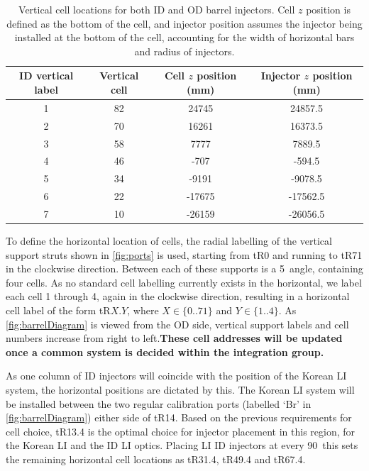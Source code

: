 \documentclass[a4paper,11pt]{article}
\begin{document}
\begin{table}[h!]
\centering
\begin{tabular}{cccc} \toprule
ID vertical label	&	Vertical cell	&	Cell $z$ position (mm)	&	Injector $z$ position (mm)	\\ \midrule
1					&		82			&		24745		&	24857.5	\\
2					&		70			&		16261		&	16373.5	\\
3					&		58			&		7777		&	7889.5	\\
4					&		46			&		-707		&	-594.5	\\
5					&		34			&		-9191		&	-9078.5	\\
6					&		22			&		-17675		&	-17562.5	\\
7					&		10			&		-26159		&	-26056.5	\\ \bottomrule
\end{tabular}
\caption{Vertical cell locations for both ID and OD barrel injectors. Cell $z$ position is defined as the bottom of the cell, and injector position assumes the injector being installed at the bottom of the cell, accounting for the width of horizontal bars and radius of injectors.}\label{tab:injvertical}
\end{table}

To define the horizontal location of cells, the radial labelling of the vertical support struts shown in \cref{fig:ports} is used, starting from tR0 and running to tR71 in the clockwise direction. Between each of these supports is a 5\degree\ angle, containing four cells. As no standard cell labelling currently exists in the horizontal, we label each cell 1 through 4, again in the clockwise direction, resulting in a horizontal cell label of the form tR$X.Y$, where $X\in\{0..71\}$ and $Y\in\{1..4\}$. As \cref{fig:barrelDiagram} is viewed from the OD side, vertical support labels and cell numbers increase from right to left.{\bf These cell addresses will be updated once a common system is decided within the integration group.}

As one column of ID injectors will coincide with the position of the Korean LI system, the horizontal positions are dictated by this. The Korean LI system will be installed between the two regular calibration ports (labelled `Br' in \cref{fig:barrelDiagram}) either side of tR14. Based on the previous requirements for cell choice, tR13.4 is the optimal choice for injector placement in this region, for the Korean LI and the ID LI optics. Placing LI ID injectors at every 90\degree\ this sets the remaining horizontal cell locations as tR31.4, tR49.4 and tR67.4.
\end{document}
